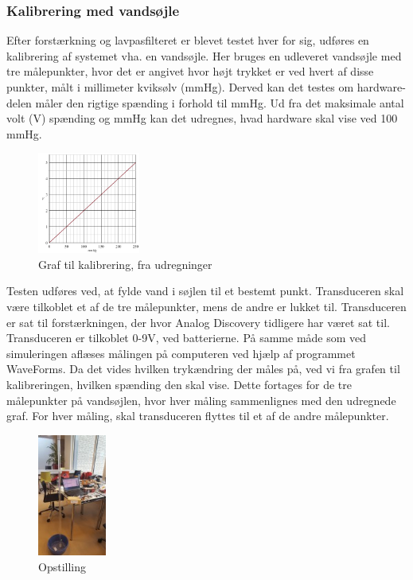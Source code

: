 \subsubsection{Kalibrering med vandsøjle}
Efter forstærkning og lavpasfilteret er blevet testet hver for sig, udføres en kalibrering af systemet vha. en vandsøjle. Her bruges en udleveret vandsøjle med tre målepunkter, hvor det er angivet hvor højt trykket er ved hvert af disse punkter, målt i millimeter kviksølv (mmHg). Derved kan det testes om hardware-delen måler den rigtige spænding i forhold til mmHg. Ud fra det maksimale antal volt (V) spænding og mmHg kan det udregnes, hvad hardware skal vise ved 100 mmHg. 
\begin{figure}[H]
	\centering
	\includegraphics[width=0.3\textwidth]{Figurer/graf_vandtest}
	\caption{Graf til kalibrering, fra udregninger}
	\label{fig:graf_vandtest}
\end{figure}
Testen udføres ved, at fylde vand i søjlen til et bestemt punkt. Transduceren skal være tilkoblet et af de tre målepunkter, mens de andre er lukket til. Transduceren er sat til forstærkningen, der hvor Analog Discovery tidligere har været sat til. Transduceren er tilkoblet 0-9V, ved batterierne. På samme måde som ved simuleringen aflæses målingen på computeren ved hjælp af programmet WaveForms. Da det vides hvilken trykændring der måles på, ved vi fra grafen til kalibreringen, hvilken spænding den skal vise. Dette fortages for de tre målepunkter på vandsøjlen, hvor hver måling sammenlignes med den udregnede graf. For hver måling, skal transduceren flyttes til et af de andre målepunkter.  
\begin{figure}[H]
	\centering
	\includegraphics[width=0.2\textwidth]{Figurer/vandtest3}
	\caption{Opstilling}
	\label{fig:vandtest}
\end{figure} 
